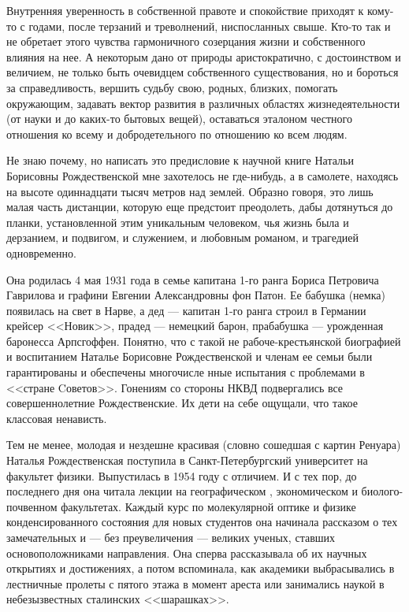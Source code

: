 ﻿\newpage
\vskip 10mm
\vskip 3mm 
\vskip 1cm
\markboth{\hfill\small \hfill}{}

\pagestyle{empty}

\thispagestyle{empty}


Внутренняя уверенность в собственной правоте и спокойствие приходят к кому-то с годами, после терзаний и треволнений, ниспосланных свыше. Кто-то так и не обретает этого чувства гармоничного созерцания жизни и собственного влияния на нее. А некоторым дано от природы аристократично, с достоинством и величием, не только быть очевидцем собственного существования, но и бороться за справедливость, вершить судьбу свою, родных, близких, помогать окружающим, задавать вектор развития в различных областях жизнедеятельности (от науки и до каких-то бытовых вещей), оставаться эталоном честного отношения ко всему и добродетельного по отношению ко всем людям.

Не знаю почему, но написать это предисловие к научной книге Натальи Борисовны Рождественской мне захотелось не где-нибудь, а в самолете, находясь на высоте одиннадцати тысяч метров над землей. Образно говоря, это лишь малая часть дистанции, которую еще предстоит преодолеть, дабы дотянуться до планки, установленной этим уникальным человеком, чья жизнь была и дерзанием, и подвигом, и служением, и любовным романом, и трагедией одновременно.

Она родилась 4 мая 1931 года в семье капитана 1-го ранга Бориса Петровича Гаврилова и графини Евгении Александровны фон Патон. Ее бабушка (немка) появилась на свет в Нарве, а дед --- капитан 1-го ранга строил в Германии крейсер <<Новик>>, прадед --- немецкий барон, прабабушка --- урожденная баронесса Арпсгоффен. Понятно, что с такой не рабоче-крестьянской биографией и воспитанием Наталье Борисовне Рождественской и членам ее семьи были гарантированы и обеспечены многочисле                                                       нные испытания с проблемами в <<стране Cоветов>>. Гонениям со стороны НКВД подвергались все совершеннолетние Рождественские. Их дети на себе ощущали, что такое классовая ненависть.

Тем не менее, молодая и нездешне красивая (словно сошедшая с картин Ренуара) Наталья Рождественская поступила в Санкт-Петербургский университет на факультет физики. Выпустилась в 1954 году с отличием. И с тех пор, до последнего дня она читала лекции на географическом , экономическом и биолого-почвенном факультетах. Каждый курс по молекулярной оптике и физике конденсированного состояния для новых студентов она начинала рассказом о тех замечательных и --- без преувеличения --- великих ученых, ставших основоположниками направления. Она сперва рассказывала об их научных открытиях и достижениях, а потом вспоминала, как академики выбрасывались в лестничные пролеты с пятого этажа в момент ареста или занимались наукой в небезызвестных сталинских <<шарашках>>.

